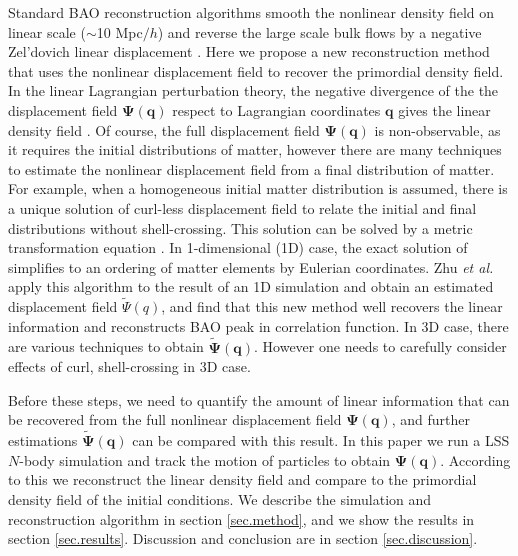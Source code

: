 \documentclass[aps,prd,twocolumn,superscriptaddress,amsfont,amssymb,amsmath,nofootinbib,showpacs,balancelastpage]{revtex4-1}
\newcommand{\bs}{\boldsymbol}
\begin{document}
Standard BAO reconstruction algorithms smooth the 
nonlinear density field on linear scale ($\sim$10 Mpc$/h$) and reverse the large 
scale bulk flows by a negative Zel'dovich linear displacement
\citep{2007ApJ...664..675E,2009PhRvD..80l3501N,2009PhRvD..79f3523P}. Here we propose a 
new reconstruction method that uses the nonlinear displacement field to recover the 
primordial density field. In the linear Lagrangian perturbation theory, the 
negative divergence of the the displacement field
$\bs\Psi(\bs q)$ respect to Lagrangian coordinates $\bs q$
gives the linear density field \citep{2010PhDT.........4J}.
Of course, the full displacement field $\bs\Psi(\bs q)$
is non-observable, as it requires the initial distributions of matter, however there are 
many techniques to estimate the nonlinear displacement field from a final 
distribution of matter. For example, when a homogeneous initial matter distribution 
is assumed, there is a unique solution of curl-less displacement field to relate 
the initial and final distributions without shell-crossing. This solution can be 
solved by a metric transformation equation \citep{1995ApJS..100..269P,1998ApJS..115...19P}.
In 1-dimensional (1D) case, the exact solution of \cite{1995ApJS..100..269P}
simplifies to an ordering of matter elements by Eulerian coordinates.
Zhu {\it et al.} \cite{2016arXiv160907041Z} apply this algorithm to the result
of an 1D simulation \citep{2016JCAP...01..043M} and obtain an estimated
displacement field $\tilde\Psi(q)$, and find that this new method well recovers the linear
information and reconstructs BAO peak in correlation function. 
In 3D case, there are various techniques to obtain $\tilde{\bs \Psi}(\bs q)$.
However one needs to carefully consider effects of curl, shell-crossing in 3D case.

Before these steps, we need to quantify the amount of linear information
that can be recovered from the full nonlinear displacement field $\bs\Psi(\bs q)$,
and further estimations $\tilde{\bs \Psi}(\bs q)$ can be compared with this result.
In this paper we run a LSS $N$-body simulation and track the motion of
particles to obtain $\bs\Psi(\bs q)$. According to this we reconstruct the linear density
field and compare to the primordial density field of the initial
conditions. We describe the simulation and reconstruction algorithm in section
\ref{sec.method}, and we show the results in section \ref{sec.results}.
Discussion and conclusion are in section \ref{sec.discussion}.
\end{document}
